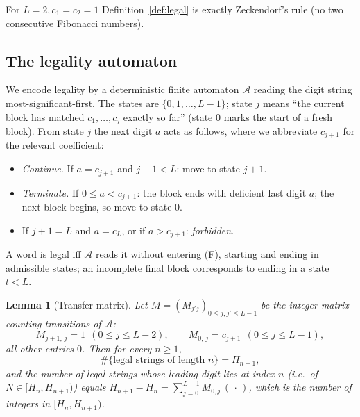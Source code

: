 \documentclass[12pt]{article}
\newtheorem{lemma}{Lemma}
\theoremstyle{definition}
\begin{document}
For $L=2,c_1=c_2=1$ Definition~\ref{def:legal} is exactly Zeckendorf's rule
(no two consecutive Fibonacci numbers).

\subsection{The legality automaton}\label{ss:automaton}
We encode legality by a deterministic finite automaton $\mathcal A$ reading the
digit string most-significant-first. The states are $\{0,1,\dots,L-1\}$; state
$j$ means ``the current block has matched $c_1,\dots,c_j$ exactly so far''
(state $0$ marks the start of a fresh block). From state $j$ the next digit $a$
acts as follows, where we abbreviate $c_{j+1}$ for the relevant coefficient:
\begin{itemize}
\item[(C)] \emph{Continue.} If $a=c_{j+1}$ and $j+1<L$: move to state $j+1$.
\item[(T)] \emph{Terminate.} If $0\le a<c_{j+1}$: the block ends with deficient
last digit $a$; the next block begins, so move to state $0$.
\item[(F)] If $j+1=L$ and $a=c_L$, or if $a>c_{j+1}$: \emph{forbidden}.
\end{itemize}
A word is legal iff $\mathcal A$ reads it without entering (F), starting and
ending in admissible states; an incomplete final block corresponds to ending in
a state $t<L$.

\begin{lemma}[Transfer matrix]\label{lem:transfer}
Let $M=(M_{j'j})_{0\le j,j'\le L-1}$ be the integer matrix counting transitions
of $\mathcal A$:
\begin{equation}\label{eq:M}
M_{j+1,\,j}=1\ \ (0\le j\le L-2),\qquad M_{0,\,j}=c_{j+1}\ \ (0\le j\le L-1),
\end{equation}
all other entries $0$. Then for every $n\ge1$,
\begin{equation}\label{eq:countH}
\#\{\text{legal strings of length }n\}=H_{n+1},
\end{equation}
and the number of legal strings whose leading digit lies at index $n$ (i.e.\ of
$N\in[H_n,H_{n+1})$) equals $H_{n+1}-H_n=\sum_{j=0}^{L-1}M_{0,j}\,(\,\cdot\,)$,
which is the number of integers in $[H_n,H_{n+1})$.
\end{lemma}
\end{document}
